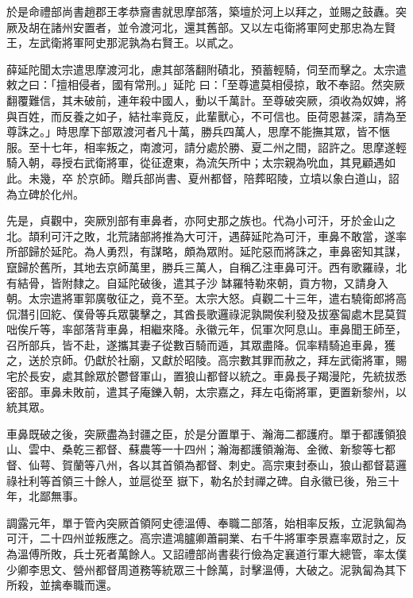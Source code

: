 \begin{pinyinscope}
 於是命禮部尚書趙郡王孝恭齎書就思摩部落，築壇於河上以拜之，並賜之鼓纛。突厥及胡在諸州安置者，並令渡河北，還其舊部。又以左屯衛將軍阿史那忠為左賢王，左武衛將軍阿史那泥孰為右賢王。以貳之。



 薛延陀聞太宗遣思摩渡河北，慮其部落翻附磧北，預蓄輕騎，伺至而擊之。太宗遣敕之曰：「擅相侵者，國有常刑。」延陀
 曰：「至尊遣莫相侵掠，敢不奉詔。然突厥翻覆難信，其未破前，連年殺中國人，動以千萬計。至尊破突厥，須收為奴婢，將與百姓，而反養之如子，結社率竟反，此輩獸心，不可信也。臣荷恩甚深，請為至尊誅之。」時思摩下部眾渡河者凡十萬，勝兵四萬人，思摩不能撫其眾，皆不愜服。至十七年，相率叛之，南渡河，請分處於勝、夏二州之間，詔許之。思摩遂輕騎入朝，尋授右武衛將軍，從征遼東，為流矢所中；太宗親為吮血，其見顧遇如此。未幾，卒
 於京師。贈兵部尚書、夏州都督，陪葬昭陵，立墳以象白道山，詔為立碑於化州。



 先是，貞觀中，突厥別部有車鼻者，亦阿史那之族也。代為小可汗，牙於金山之北。頡利可汗之敗，北荒諸部將推為大可汗，遇薛延陀為可汗，車鼻不敢當，遂率所部歸於延陀。為人勇烈，有謀略，頗為眾附。延陀惡而將誅之，車鼻密知其謀，竄歸於舊所，其地去京師萬里，勝兵三萬人，自稱乙注車鼻可汗。西有歌羅祿，北有結骨，皆附隸之。自延陀破後，遣其子沙
 缽羅特勒來朝，貢方物，又請身入朝。太宗遣將軍郭廣敬征之，竟不至。太宗大怒。貞觀二十三年，遣右驍衛郎將高侃潛引回紇、僕骨等兵眾襲擊之，其酋長歌邏祿泥孰闕俟利發及拔塞匐處木昆莫賀咄俟斤等，率部落背車鼻，相繼來降。永徽元年，侃軍次阿息山。車鼻聞王師至，召所部兵，皆不赴，遂攜其妻子從數百騎而遁，其眾盡降。侃率精騎追車鼻，獲之，送於京師。仍獻於社廟，又獻於昭陵。高宗數其罪而赦之，拜左武衛將軍，賜
 宅於長安，處其餘眾於鬱督軍山，置狼山都督以統之。車鼻長子羯漫陀，先統拔悉密部。車鼻未敗前，遣其子庵鑠入朝，太宗嘉之，拜左屯衛將軍，更置新黎州，以統其眾。



 車鼻既破之後，突厥盡為封疆之臣，於是分置單于、瀚海二都護府。單于都護領狼山、雲中、桑乾三都督、蘇農等一十四州；瀚海都護領瀚海、金微、新黎等七都督、仙萼、賀蘭等八州，各以其首領為都督、刺史。高宗東封泰山，狼山都督葛邏祿社利等首領三十餘人，並扈從至
 嶽下，勒名於封禪之碑。自永徽已後，殆三十年，北鄙無事。



 調露元年，單于管內突厥首領阿史德溫傅、奉職二部落，始相率反叛，立泥孰匐為可汗，二十四州並叛應之。高宗遣鴻臚卿蕭嗣業、右千牛將軍李景嘉率眾討之，反為溫傅所敗，兵士死者萬餘人。又詔禮部尚書裴行儉為定襄道行軍大總管，率太僕少卿李思文、營州都督周道務等統眾三十餘萬，討擊溫傅，大破之。泥孰匐為其下所殺，並擒奉職而還。




\end{pinyinscope}
